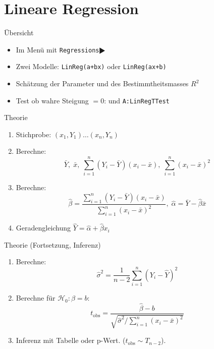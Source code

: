 \documentclass{beamer}
\newlength{\tikey}
\newcommand{\keystroke}[1]{\settowidth{\tikey}{\scriptsize #1}\psframebox[framearc=0.2]{\parbox{\tikey}{\scriptsize #1}}}
\begin{document}
\section{Lineare Regression}
\begin{frame}{Übersicht}
\begin{itemize}
\item Im Menü \keystroke{F4} mit \texttt{Regressions$\RHD$}
\item Zwei Modelle: \texttt{LinReg(a+bx)} oder \texttt{LinReg(ax+b)}
\item Schätzung der Parameter und des Bestimmtheitsmasses $R^2$
\item Test ob wahre Steigung $= 0$: \keystroke{F6} und \texttt{A:LinRegTTest}
\end{itemize}
\end{frame}

\begin{frame}{Theorie}
\begin{enumerate}
\item Stichprobe: $(x_1,Y_1)\ldots(x_n, Y_n)$
\item Berechne:
$$
\bar{Y},\; \bar{x},\; \sum_{i=1}^n (Y_i-\bar{Y})(x_i-\bar{x}),\; \sum_{i=1}^n(x_i-\bar{x})^2
$$

\item Berechne:
$$
\hat{\beta} = \frac{\sum_{i=1}^n (Y_i-\bar{Y})(x_i-\bar{x})}{\sum_{i=1}^n(x_i-\bar{x})^2},\;
\hat{\alpha} = \bar{Y}-\hat{\beta}\bar{x}
$$

\item Geradengleichung $\hat{Y}=\hat{\alpha}+\hat{\beta}x_i$
\end{enumerate}
\end{frame}

\begin{frame}{Theorie (Fortsetzung, Inferenz)}
\begin{enumerate}
\item Berechne:
$$
\hat{\sigma}^2 = \frac{1}{n-2}\sum_{i=1}^n (Y_i-\hat{Y})^2
$$
\item Berechne für $\mathcal{H}_0: \beta=b$:
$$
t_\text{obs}=\frac{\hat\beta-b}{\sqrt{\hat\sigma^2/\sum_{i=1}^n(x_i-\bar{x})^2}}
$$
\item Inferenz mit Tabelle oder p-Wert. ($t_\text{obs}\sim T_{n-2}$).
\end{enumerate}
\end{frame}
\end{document}
